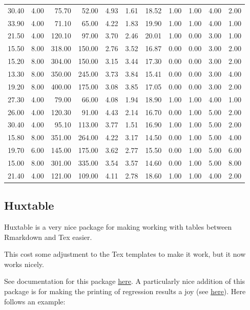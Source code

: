 \documentclass[11pt,preprint, authoryear]{elsarticle}
\numberwithin{equation}{section}
\numberwithin{figure}{section}
\numberwithin{table}{section}
\begin{document}
\begin{longtable}{rrrrrrrrrrr}
  30.40 & 4.00 & 75.70 & 52.00 & 4.93 & 1.61 & 18.52 & 1.00 & 1.00 & 4.00 & 2.00 \\ 
  33.90 & 4.00 & 71.10 & 65.00 & 4.22 & 1.83 & 19.90 & 1.00 & 1.00 & 4.00 & 1.00 \\ 
  21.50 & 4.00 & 120.10 & 97.00 & 3.70 & 2.46 & 20.01 & 1.00 & 0.00 & 3.00 & 1.00 \\ 
  15.50 & 8.00 & 318.00 & 150.00 & 2.76 & 3.52 & 16.87 & 0.00 & 0.00 & 3.00 & 2.00 \\ 
  15.20 & 8.00 & 304.00 & 150.00 & 3.15 & 3.44 & 17.30 & 0.00 & 0.00 & 3.00 & 2.00 \\ 
  13.30 & 8.00 & 350.00 & 245.00 & 3.73 & 3.84 & 15.41 & 0.00 & 0.00 & 3.00 & 4.00 \\ 
  19.20 & 8.00 & 400.00 & 175.00 & 3.08 & 3.85 & 17.05 & 0.00 & 0.00 & 3.00 & 2.00 \\ 
  27.30 & 4.00 & 79.00 & 66.00 & 4.08 & 1.94 & 18.90 & 1.00 & 1.00 & 4.00 & 1.00 \\ 
  26.00 & 4.00 & 120.30 & 91.00 & 4.43 & 2.14 & 16.70 & 0.00 & 1.00 & 5.00 & 2.00 \\ 
  30.40 & 4.00 & 95.10 & 113.00 & 3.77 & 1.51 & 16.90 & 1.00 & 1.00 & 5.00 & 2.00 \\ 
  15.80 & 8.00 & 351.00 & 264.00 & 4.22 & 3.17 & 14.50 & 0.00 & 1.00 & 5.00 & 4.00 \\ 
  19.70 & 6.00 & 145.00 & 175.00 & 3.62 & 2.77 & 15.50 & 0.00 & 1.00 & 5.00 & 6.00 \\ 
  15.00 & 8.00 & 301.00 & 335.00 & 3.54 & 3.57 & 14.60 & 0.00 & 1.00 & 5.00 & 8.00 \\ 
  21.40 & 4.00 & 121.00 & 109.00 & 4.11 & 2.78 & 18.60 & 1.00 & 1.00 & 4.00 & 2.00 \\ 
   \bottomrule
\end{longtable}
\endgroup

\hfill

\hypertarget{huxtable}{%
\subsection{Huxtable}\label{huxtable}}

Huxtable is a very nice package for making working with tables between
Rmarkdown and Tex easier.

This cost some adjustment to the Tex templates to make it work, but it
now works nicely.

See documentation for this package
\href{https://hughjonesd.github.io/huxtable/huxtable.html}{here}. A
particularly nice addition of this package is for making the printing of
regression results a joy (see
\href{https://hughjonesd.github.io/huxtable/huxtable.html\#creating-a-regression-table}{here}).
Here follows an example:
\end{document}
